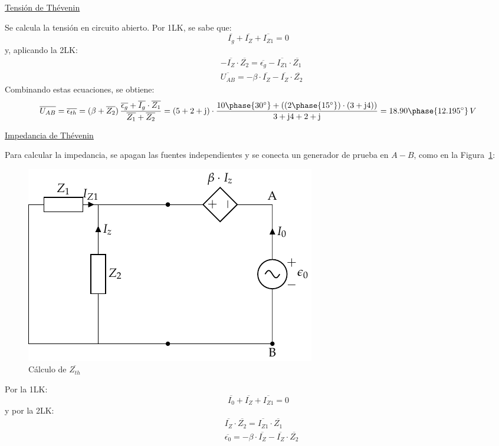 \documentclass[11pt]{book} %
\begin{document}
\begin{example}
\underline{Tensión de Thévenin}

Se calcula la tensión en circuito abierto. Por 1LK, se sabe que:
\begin{equation*}
    \overline{I_g} + \overline{I_Z} + \overline{I_{Z1}} = 0 
\end{equation*}
y, aplicando la 2LK: 
\begin{align*}
    &- \overline{I_Z} \cdot \overline{Z_2} = \overline{\epsilon_g} - \overline{I_{Z1}} \cdot \overline{Z_1}\\
   &\overline{U_{AB}} = - \beta \cdot \overline{I_Z} - \overline{I_Z} \cdot \overline{Z_2}
\end{align*}
Combinando estas ecuaciones, se obtiene:
\begin{equation*}
  \overline{U_{AB}}=\overline{\epsilon_{th}} = (\beta + \overline{Z_2}) \, \dfrac{\overline{\epsilon_g} + \overline{I_g} \cdot \overline{Z_1}}{\overline{Z_1} + \overline{Z_2}} = (5+2+\mathrm{j})\cdot\dfrac{10\phase{30^\circ}+((2\phase{15^\circ})\cdot (3+\mathrm{j}4))}{3 + \mathrm{j}4+2 + \mathrm{j}}= 18.90\phase{12.195^\circ}\,V 
\end{equation*}

\underline{Impedancia de Thévenin}

Para calcular la impedancia, se apagan las fuentes independientes y se conecta un generador de prueba en $A-B$, como en la Figura~\ref{fig.thevenin6_zth}:
\begin{figure}[H]
    \centering
    \includegraphics[width=0.5\linewidth]{../figs/thevenin6_fuenteprueba.pdf}
    \caption{Cálculo de $\overline{Z_{th}}$}
    \label{fig.thevenin6_zth}
\end{figure}

Por la 1LK:
\begin{equation*}
    \overline{I_0} + \overline{I_Z} + \overline{I_{Z1}} = 0
\end{equation*}
y por la 2LK:
\begin{align*}
    &\overline{I_Z} \cdot \overline{Z_2} = \overline{I_{Z1}} \cdot \overline{Z_1}\\
    &\overline{\epsilon_0} = - \beta \cdot \overline{I_Z} - \overline{I_Z} \cdot \overline{Z_2}
  \end{align*}


\end{example}
\end{document}

